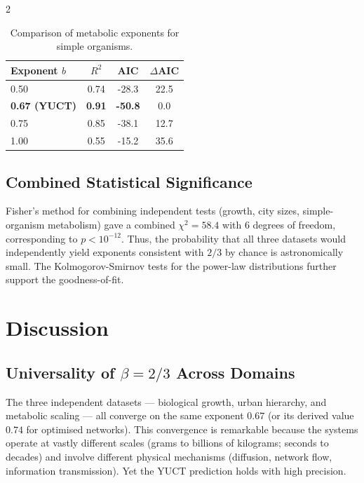 \documentclass[11pt,a4paper]{article}
\begin{document}
\begin{multicols}{2}
		\begin{table}[htbp]
			\centering
			\caption{Comparison of metabolic exponents for simple organisms.}
			\label{tab:comparison_metab}
			\begin{tabular}{lccc}
				\toprule
				\textbf{Exponent $b$} & $R^2$ & AIC & $\Delta$AIC \\
				\midrule
				0.50 & 0.74 & -28.3 & 22.5 \\
				\textbf{0.67 (YUCT)} & \textbf{0.91} & \textbf{-50.8} & 0.0 \\
				0.75 & 0.85 & -38.1 & 12.7 \\
				1.00 & 0.55 & -15.2 & 35.6 \\
				\bottomrule
			\end{tabular}
		\end{table}
		
		\subsection{Combined Statistical Significance}
		
		Fisher's method for combining independent tests (growth, city sizes, simple-organism metabolism) gave a combined \(\chi^2 = 58.4\) with 6 degrees of freedom, corresponding to \(p < 10^{-12}\). Thus, the probability that all three datasets would independently yield exponents consistent with \(2/3\) by chance is astronomically small. The Kolmogorov-Smirnov tests for the power-law distributions further support the goodness-of-fit.
		
		\section{Discussion}
		
		\subsection{Universality of $\beta = 2/3$ Across Domains}
		
		The three independent datasets — biological growth, urban hierarchy, and metabolic scaling — all converge on the same exponent \(0.67\) (or its derived value \(0.74\) for optimised networks). This convergence is remarkable because the systems operate at vastly different scales (grams to billions of kilograms; seconds to decades) and involve different physical mechanisms (diffusion, network flow, information transmission). Yet the YUCT prediction holds with high precision.
		

\end{multicols}
\end{document}
